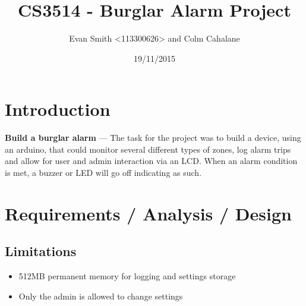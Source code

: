 \documentclass[a4paper,11pt]{article}
\theoremstyle{mytheor}
\begin{document}
\title{CS3514 - Burglar Alarm Project}

\author{Evan Smith <113300626> and Colm Cahalane}

\date{19/11/2015}

\maketitle

\tableofcontents
\newpage


\section{Introduction}
\textbf{Build a burglar alarm }--- The task for the project was to build a device, using an arduino, that could monitor several different types of zones, log alarm trips and allow for user and admin interaction via an LCD. When an alarm condition is met, a buzzer or LED will go off indicating as such.

\section{Requirements / Analysis / Design }
\subsection{Limitations}
\begin{itemize}
    \item 512MB permanent memory for logging and settings storage
    \item Only the admin is allowed to change settings
\end{itemize}
\end{document}
